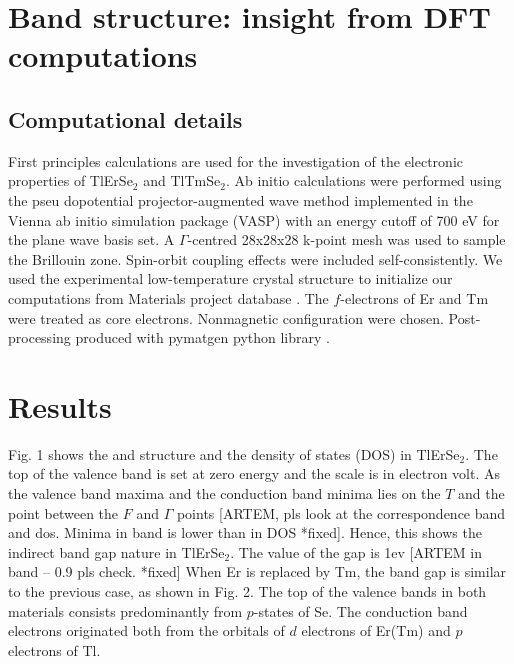 \documentclass[onecolumn]{revtex4}
\date{\today}
\begin{document}
\maketitle
\tableofcontents
\section{Band structure: insight from DFT computations}
\subsection{Computational details}

First principles calculations are used for the investigation of the electronic properties of TlErSe$_2$ and TlTmSe$_2$. 
Ab initio calculations were performed using the pseu
dopotential projector-augmented wave method \cite{Kresse1999} implemented in the Vienna ab initio simulation package
(VASP) \cite{Kresse1996,Kresse1993} with an energy cutoff of 700 eV for the plane wave basis set. A $\Gamma$-centred  28x28x28 k-point mesh was used to sample the Brillouin zone. Spin-orbit coupling effects were included self-consistently. We used the experimental low-temperature crystal structure to initialize our
computations from Materials project database \cite{MaterialsProject}. The $ f $-electrons of Er and Tm were treated as core electrons. Nonmagnetic configuration were chosen. Post-processing produced with pymatgen python library \cite{Pymatgen}. 
 
\section{Results}
Fig. 1 shows the and structure and the density of states (DOS) in TlErSe$_2$. The top of the valence band is set at zero energy and the scale is in electron volt. As the valence band maxima and the conduction band minima lies on the $T$ and the point between the $F$ and $\Gamma$ points [ARTEM, pls look at the correspondence band and dos. Minima in band is lower than in DOS *fixed]. Hence, this shows the indirect band gap nature in TlErSe$_2$. The value of the gap is 1ev [ARTEM in band -- 0.9 pls check. *fixed] 
When Er is replaced by Tm, the band gap is similar to the previous case, as shown in Fig. 2. 
The top of the valence bands in both materials consists predominantly from $ p $-states of Se.
The conduction band electrons originated both from the orbitals of $ d $  electrons of Er(Tm) and $ p $  electrons of Tl.  
 
 
\end{document}
